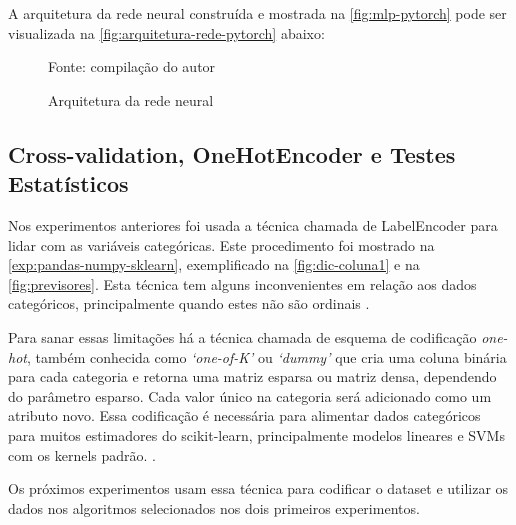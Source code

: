 A arquitetura da rede neural construída e mostrada na \autoref{fig:mlp-pytorch} pode ser visualizada na \autoref{fig:arquitetura-rede-pytorch} abaixo:

\begin{figure}[H]
	\centering
	\caption{Arquitetura da rede neural}
	
	\label{fig:arquitetura-rede-pytorch}
	{\scriptsize Fonte: compilação do autor}
\end{figure}

\subsection{Cross-validation, OneHotEncoder e Testes Estatísticos}\label{exo:cross-validation}
Nos experimentos anteriores foi usada a técnica chamada de LabelEncoder para lidar com as variáveis categóricas. Este procedimento foi mostrado na \autoref{exp:pandas-numpy-sklearn}, exemplificado na \autoref{fig:dic-coluna1} e na \autoref{fig:previsores}. Esta técnica tem alguns inconvenientes em relação aos dados categóricos, principalmente quando estes não são ordinais \cite{shen_learning_2019}.

Para sanar essas limitações há a técnica chamada de esquema de codificação \textit{one-hot}, também conhecida como \textit{`one-of-K'} ou \textit{`dummy'} que cria uma coluna binária para cada categoria e retorna uma matriz esparsa ou matriz densa, dependendo do parâmetro esparso. Cada valor único na categoria será adicionado como um atributo novo. Essa codificação é necessária para alimentar dados categóricos para muitos estimadores do scikit-learn, principalmente modelos lineares e SVMs com os kernels padrão. \cite{scikit-learn} \cite{shen_learning_2019}.

Os próximos experimentos usam essa técnica para codificar o dataset e utilizar os dados nos algoritmos selecionados nos dois primeiros experimentos.

